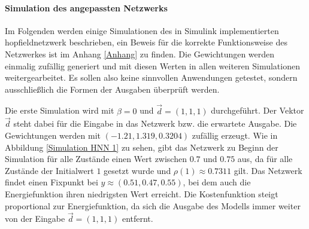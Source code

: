 \paragraph{Simulation des angepassten Netzwerks}
\label{chap:Simulation des angepassten Netzwerks}

Im Folgenden werden einige Simulationen des in Simulink implementierten \gls{hopfieldnetzwerk} beschrieben, ein Beweis für die korrekte Funktionsweise des Netzwerkes ist im Anhang \ref{Anhang} zu finden. Die Gewichtungen werden einmalig zufällig generiert und mit diesen Werten in allen weiteren Simulationen weitergearbeitet. Es sollen also keine sinnvollen Anwendungen getestet, sondern ausschließlich die Formen der Ausgaben überprüft werden.

Die erste Simulation wird mit \(\beta=0\) und \(\vec{d}=(1,1,1)\) durchgeführt. Der Vektor \(\vec{d}\) steht dabei für die Eingabe in das Netzwerk bzw. die erwartete Ausgabe. Die Gewichtungen werden mit \((-1.21,1.319,0.3204)\) zufällig erzeugt. Wie in Abbildung \ref{Simulation HNN 1} zu sehen, gibt das Netzwerk zu Beginn der Simulation für alle Zustände einen Wert zwischen \(0.7\) und \(0.75\) aus, da für alle Zustände der Initialwert \(1\) gesetzt wurde und \(\rho(1)\approx{0.7311}\) gilt. Das Netzwerk findet einen Fixpunkt bei \(y\approx{(0.51,0.47,0.55)}\), bei dem auch die Energiefunktion ihren niedrigsten Wert erreicht. Die Kostenfunktion steigt proportional zur Energiefunktion, da sich die Ausgabe des Modells immer weiter von der Eingabe \(\vec{d}=(1,1,1)\) entfernt.

